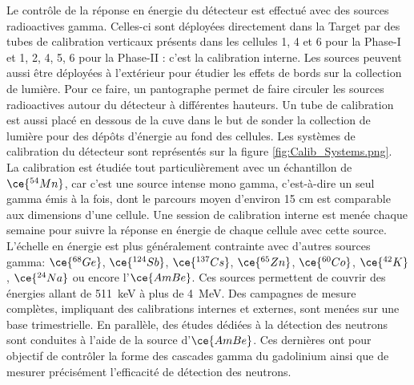 Le contrôle de la réponse en énergie du détecteur est effectué avec des sources radioactives gamma. Celles-ci sont déployées directement dans la Target par des tubes de calibration verticaux présents dans les cellules 1, 4 et 6 pour la Phase-I et 1, 2, 4, 5, 6 pour la Phase-II : c'est la calibration interne. Les sources peuvent aussi être déployées à l'extérieur pour étudier les effets de bords sur la collection de lumière. Pour ce faire, un \og pantographe \fg{} permet de faire circuler les sources radioactives autour du détecteur à différentes hauteurs. Un tube de calibration est aussi placé en dessous de la cuve dans le but de sonder la collection de lumière pour des dépôts d'énergie au fond des cellules. Les systèmes de calibration du détecteur sont représentés sur la figure \ref{fig:Calib_Systems.png}.\\

La calibration est étudiée tout particulièrement avec un échantillon de $\ce{^{54}Mn}$, car c'est une source intense mono gamma, c'est-à-dire un seul gamma émis à la fois, dont le parcours moyen d'environ 15 cm est comparable aux dimensions d'une cellule. Une session de calibration interne est menée chaque semaine pour suivre la réponse en énergie de chaque cellule avec cette source. L'échelle en énergie est plus généralement contrainte avec d'autres sources gamma: $\ce{^{68}Ge}$, $\ce{^{124}Sb}$, $\ce{^{137}Cs}$, $\ce{^{65}Zn}$, $\ce{^{60}Co}$, $\ce{^{42}K}$, $\ce{^{24}Na}$ ou encore l'$\ce{AmBe}$. Ces sources permettent de couvrir des énergies allant de \SI{511}{keV} à plus de \SI{4}{MeV}. Des campagnes de mesure complètes, impliquant des calibrations internes et externes, sont menées sur une base trimestrielle. En parallèle, des études dédiées à la détection des neutrons sont conduites à l'aide de la source d'$\ce{AmBe}$. Ces dernières ont pour objectif de contrôler la forme des cascades gamma du gadolinium ainsi que de mesurer précisément l'efficacité de détection des neutrons.\\ 

